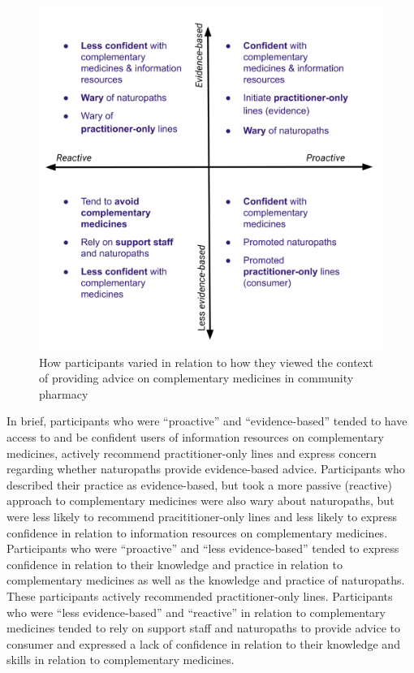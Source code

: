 \documentclass[11pt,a4paper]{article}
\begin{document}
\begin{figure}
\centering
\includegraphics{files/CMEthics_context2.png}
\caption{How participants varied in relation to how they viewed the
context of providing advice on complementary medicines in community
pharmacy \label{fig_context2}}
\end{figure}

In brief, participants who were ``proactive'' and ``evidence-based''
tended to have access to and be confident users of information resources
on complementary medicines, actively recommend practitioner-only lines
and express concern regarding whether naturopaths provide evidence-based
advice. Participants who described their practice as evidence-based, but
took a more passive (reactive) approach to complementary medicines were
also wary about naturopaths, but were less likely to recommend
pracititioner-only lines and less likely to express confidence in
relation to information resources on complementary medicines.
Participants who were ``proactive'' and ``less evidence-based'' tended
to express confidence in relation to their knowledge and practice in
relation to complementary medicines as well as the knowledge and
practice of naturopaths. These participants actively recommended
practitioner-only lines. Participants who were ``less evidence-based''
and ``reactive'' in relation to complementary medicines tended to rely
on support staff and naturopaths to provide advice to consumer and
expressed a lack of confidence in relation to their knowledge and skills
in relation to complementary medicines.
\end{document}
